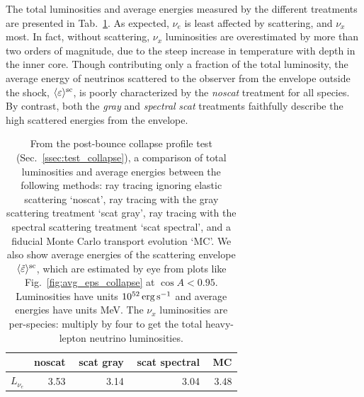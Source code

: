 \documentclass[aps,floatfix,prd,superscriptaddress,twocolumn]{revtex4-1}
\begin{document}
The total luminosities and average energies
measured by the different treatments are
presented in Tab.~\ref{tab:collapse_rt_vs_mc}.
As expected, $\nu_e$ is least affected by scattering, and $\nu_x$ most.
In fact, without scattering, $\nu_x$ luminosities are overestimated by more than
two orders of magnitude, due to the steep increase in temperature with depth
in the inner core.
Though contributing only a fraction of the total luminosity,
the average energy of neutrinos scattered to the observer from the envelope
outside the shock, $\langle\varepsilon\rangle^{\rm sc}$,
is poorly characterized by the \emph{noscat} treatment for all species.
By contrast, both the \emph{gray} and \emph{spectral} \emph{scat} treatments
faithfully describe the high scattered energies from the envelope.

\begin{table}%
  \caption{
    From the post-bounce collapse profile test (Sec.~\ref{ssec:test_collapse}),
    a comparison of total luminosities and average energies between
    the following methods:
    ray tracing ignoring elastic scattering `noscat',
    ray tracing with the gray scattering treatment `scat gray',
    ray tracing with the spectral scattering treatment `scat spectral', and
    a fiducial Monte Carlo transport evolution `MC'.
    We also show average energies of the scattering envelope
    $\langle\tilde{\varepsilon}\rangle^{\rm sc}$, which are estimated by eye
    from plots like Fig.~\ref{fig:avg_eps_collapse} at $\cos A < 0.95$.
    Luminosities have units $10^{52}\,{\rm erg}\,{\rm s}^{-1}$ and
    average energies have units MeV.
    The $\nu_x$ luminosities are per-species:
    multiply by four to get the total heavy-lepton neutrino luminosities.
  }
  \label{tab:collapse_rt_vs_mc}
  \begin{tabularx}{\columnwidth}{X r r r r}
    & {\bf noscat} & \,\,{\bf scat gray} & \,\,{\bf scat spectral} & \,\,{\bf MC} \\
    \hline
    $L_{\nu_e}$                                         &  3.53 & 3.14 & 3.04 & 3.48 \\

\end{tabularx}
\end{table}
\end{document}
